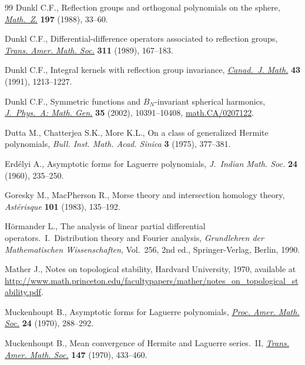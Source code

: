 \begin{thebibliography}{99}
Dunkl C.F., Ref\/lection groups and orthogonal polynomials on the sphere,
  \href{http://dx.doi.org/10.1007/BF01161629}{\textit{Math.~Z.}} \textbf{197} (1988), 33--60.

Dunkl C.F., Dif\/ferential-dif\/ference operators associated to ref\/lection groups,
  \href{http://dx.doi.org/10.2307/2001022}{\textit{Trans. Amer. Math. Soc.}} \textbf{311} (1989), 167--183.

Dunkl C.F., Integral kernels with ref\/lection group invariance,
  \href{http://dx.doi.org/10.4153/CJM-1991-069-8}{\textit{Canad.~J. Math.}} \textbf{43} (1991), 1213--1227.

Dunkl C.F., Symmetric functions and {$B_N$}-invariant spherical harmonics,
  \href{http://dx.doi.org/10.1088/0305-4470/35/48/312}{\textit{J.~Phys.~A: Math. Gen.}} \textbf{35} (2002), 10391--10408,
  \href{http://arxiv.org/abs/math.CA/0207122}{math.CA/0207122}.

Dutta M., Chatterjea S.K., More K.L., On a class of generalized {H}ermite
  polynomials, \textit{Bull. Inst. Math. Acad. Sinica} \textbf{3} (1975),
  377--381.

Erd{\'e}lyi A., Asymptotic forms for {L}aguerre polynomials, \textit{J.~Indian
  Math. Soc.} \textbf{24} (1960), 235--250.

Goresky M., MacPherson R., Morse theory and intersection homology theory,
  \textit{Ast\'erisque} \textbf{101} (1983), 135--192.

H{\"o}rmander L., The analysis of linear partial dif\/ferential operators.~{I}.~Distribution theory and Fourier ana\-lysis,
  \textit{Grundlehren der Mathematischen Wissenschaften}, Vol.~256, 2nd ed.,
  Springer-Verlag, Berlin, 1990.

Mather J., Notes on topological stability, Hardvard University, 1970, available at
  \url{http://www.math.princeton.edu/facultypapers/mather/notes_on_topological_stability.pdf}.

Muckenhoupt B., Asymptotic forms for {L}aguerre polynomials, \href{http://dx.doi.org/10.1090/S0002-9939-1970-0251272-9}{\textit{Proc.
  Amer. Math. Soc.}} \textbf{24} (1970), 288--292.

Muckenhoupt B., Mean convergence of {H}ermite and {L}aguerre series.~{II},
  \href{http://dx.doi.org/10.1090/S0002-9947-1970-0256051-9}{\textit{Trans. Amer. Math. Soc.}} \textbf{147} (1970), 433--460.


\end{thebibliography}
